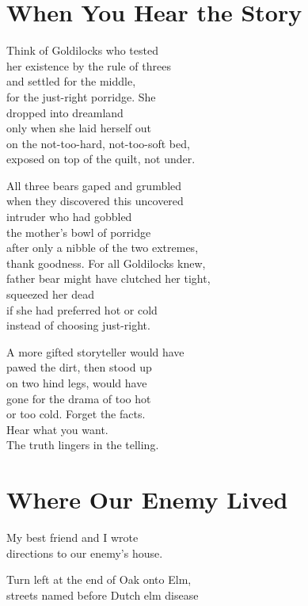\documentclass[twoside,10pt]{book}
\begin{document}
\clearpage
\section{When You Hear the Story}

Think of Goldilocks who tested\\
her existence by the rule of threes\\
and settled for the middle,\\
for the just-right porridge. She\\
dropped into dreamland\\
only when she laid herself out\\
on the not-too-hard, not-too-soft bed,\\
exposed on top of the quilt, not under.

All three bears gaped and grumbled\\
when they discovered this uncovered\\
intruder who had gobbled\\
the mother's bowl of porridge\\
after only a nibble of the two extremes,\\
thank goodness. For all Goldilocks knew,\\
father bear might have clutched her tight,\\
squeezed her dead\\
if she had preferred hot or cold\\
instead of choosing just-right.

A more gifted storyteller would have\\
pawed the dirt, then stood up\\
on two hind legs, would have\\
gone for the drama of too hot\\
or too cold. Forget the facts.\\
Hear what you want.\\
The truth lingers in the telling.


\clearpage
\section{Where Our Enemy Lived}

My best friend and I wrote\\
directions to our enemy's house.

Turn left at the end of Oak onto Elm,\\
streets named before Dutch elm disease
\end{document}
